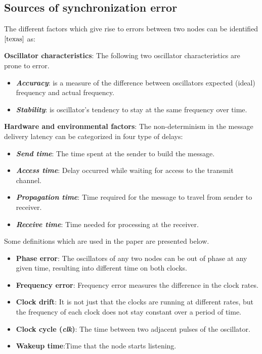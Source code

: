 \documentclass[journal]{IEEEtran}
\begin{document}
\subsection{\textbf{Sources of synchronization error}}
The different factors which give rise to errors between two nodes can be identified$\cite{texas}$ as:\par \noindent
\textbf{Oscillator characteristics}: The following two oscillator characteristics are prone to error.
         \begin{itemize}
         \item \emph{\textbf{Accuracy}}: is a measure of the difference between oscillators expected (ideal)
           frequency and actual frequency.
         \item \emph{\textbf{Stability}}: is oscillator's tendency to stay at the same frequency over
           time.
      \end{itemize}
\textbf{Hardware and environmental factors}: The non-determinism in the message delivery latency can be categorized in four type of delays:
      \begin{itemize}
         \item \emph{\textbf{Send time}}: The time spent at the sender to build the message.
         \item \emph{\textbf{Access time}}: Delay occurred while waiting for access to the transmit channel.
         \item \emph{\textbf{Propagation time}}: Time required for the message to travel from sender to receiver.
         \item \emph{\textbf{Receive time}}: Time needed for processing at the receiver.
      \end{itemize}
Some definitions which are used in the paper are presented below.
\begin{itemize}
\item \textbf{Phase error}: The oscillators of any two nodes can be out of phase at any given time, resulting into different time on both clocks.
\item \textbf{Frequency error}: Frequency error measures the difference in the clock rates.
\item \textbf{Clock drift}: It is not just that the clocks are running at different rates, but the frequency of each clock does not stay constant over a period of time.
\item \textbf{Clock cycle (\textit{clk})}: The time between two adjacent pulses of the oscillator.
\item \textbf{Wakeup time}:Time that the node starts listening.
\end{itemize}
\end{document}
